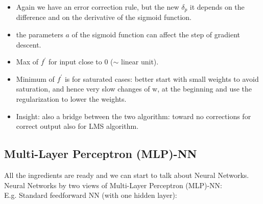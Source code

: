 \documentclass[../main.tex]{subfiles}
\begin{document}
\begin{itemize}
    \item Again we have an error correction rule, but the new $\delta_p$ it depends on the difference and on the derivative of the sigmoid function.
    
    \item the parameters $a$ of the sigmoid function  can affect the step of gradient descent.
    
    \item Max of $f^{'}$ for input close to $0$ ($\sim$ linear unit).
    
    \item Minimum of  $f^{'}$ is for saturated cases: better start with small weights to avoid saturation, and hence very slow changes of w, at the beginning and use the regularization to lower the weights.
    
    \item Insight: also a bridge between the two algorithm: toward no corrections for correct output also for LMS algorithm.
\end{itemize}

\subsection{Multi-Layer Perceptron (MLP)-NN}
All the ingredients are ready and we can start to talk about Neural Networks. Neural Networks by two views of Multi-Layer Perceptron (MLP)-NN:\\

\noindent E.g. Standard feedforward NN (with one hidden layer):\\
\end{document}
